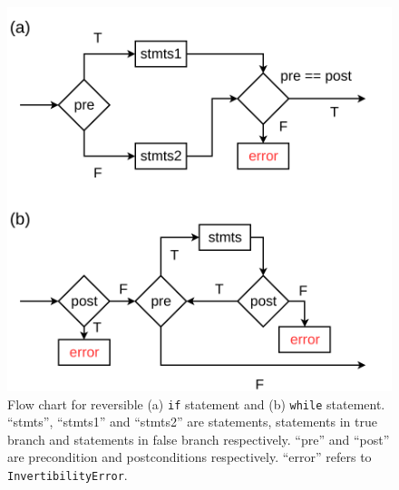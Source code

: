 \documentclass[aps,twocolumn,longbibliography,english,superscriptaddress,prr]{revtex4-1}
\newcommand{\<}{\langle}
\renewcommand{\>}{\rangle}
\theoremstyle{definition}\newtheorem{definition}{\textit{Definition}}
\begin{document}
\begin{figure}
    \centerline{\includegraphics[width=0.8\columnwidth,trim={0 0cm 0 0cm},clip]{images/controlflow.pdf}}
    \caption{Flow chart for reversible (a) \texttt{if} statement and (b) \texttt{while} statement. ``stmts'', ``stmts1'' and ``stmts2'' are statements, statements in true branch and statements in false branch respectively. ``pre'' and ``post'' are precondition and postconditions respectively. ``error'' refers to \texttt{InvertibilityError}.}\label{fig:controlflow}
\end{figure}
\end{document}
